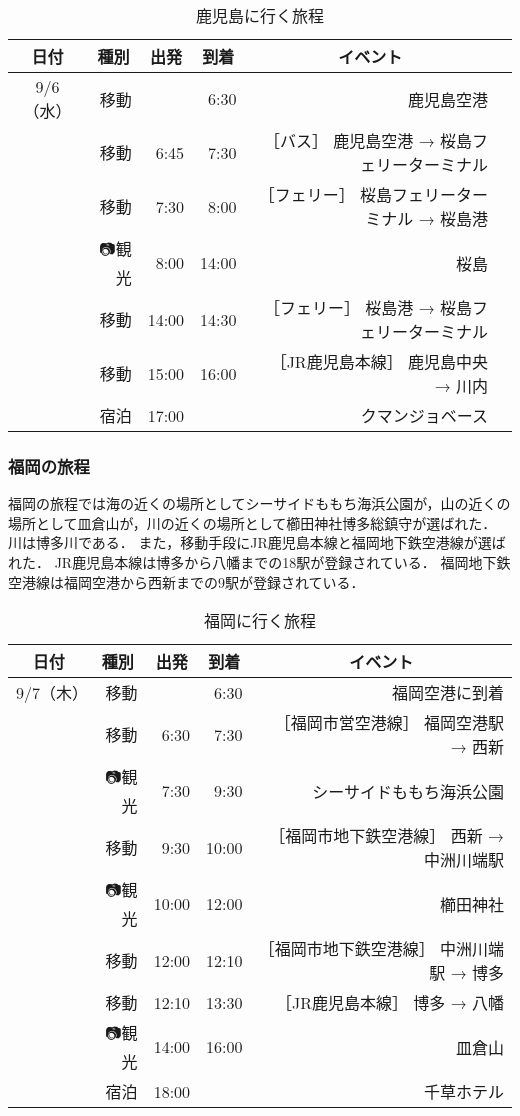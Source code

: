 \begin{table}[h]
  \caption{鹿児島に行く旅程}
  \centering
  \begin{tabular}{|c|r|r|r|r|r|}
  \hline
  \multicolumn{1}{|c|}{日付} & \multicolumn{1}{c|}{種別} & \multicolumn{1}{c|}{出発} & \multicolumn{1}{c|}{到着} & \multicolumn{1}{c|}{イベント}\\
  \hline \hline
  9/6（水） & 👣移動 &  & 6:30 & 鹿児島空港\\ \hline
  & 👣移動 & 6:45 & 7:30 & ［バス］ 鹿児島空港 → 桜島フェリーターミナル\\ \hline
  & 👣移動 & 7:30 & 8:00 & ［フェリー］ 桜島フェリーターミナル → 桜島港\\ \hline
  & 📷観光 & 8:00 & 14:00 & 桜島\\ \hline
  & 👣移動 & 14:00 & 14:30 & ［フェリー］ 桜島港 → 桜島フェリーターミナル \\ \hline
  & 👣移動 & 15:00 & 16:00 & ［JR鹿児島本線］ 鹿児島中央 → 川内\\ \hline
  & 🏨宿泊 & 17:00 &  & クマンジョベース\\ \hline
  \end{tabular}
  \label{table:resultEx1}
\end{table}

\subsubsection{福岡の旅程}
福岡の旅程では海の近くの場所としてシーサイドももち海浜公園が，山の近くの場所として皿倉山が，川の近くの場所として櫛田神社博多総鎮守が選ばれた．
川は博多川である．
また，移動手段にJR鹿児島本線と福岡地下鉄空港線が選ばれた．
JR鹿児島本線は博多から八幡までの18駅が登録されている．
福岡地下鉄空港線は福岡空港から西新までの9駅が登録されている．

\begin{table}[h]
  \caption{福岡に行く旅程}
  \centering
  \begin{tabular}{|c|r|r|r|r|}
  \hline
  \multicolumn{1}{|c|}{日付} &  \multicolumn{1}{c|}{種別} &  \multicolumn{1}{c|}{出発} &  \multicolumn{1}{c|}{到着} &  \multicolumn{1}{c|}{イベント}\\
  \hline \hline
  9/7（木） & 👣移動 &  & 6:30 & 福岡空港に到着\\ \hline
   & 👣移動 & 6:30 & 7:30 & ［福岡市営空港線］ 福岡空港駅 → 西新\\ \hline
   & 📷観光 & 7:30 & 9:30 & シーサイドももち海浜公園\\ \hline
   & 👣移動 & 9:30 & 10:00 & ［福岡市地下鉄空港線］ 西新 → 中洲川端駅\\ \hline
   & 📷観光 & 10:00 & 12:00 & 櫛田神社\\ \hline
   & 👣移動 & 12:00 & 12:10 & ［福岡市地下鉄空港線］ 中洲川端駅 → 博多\\ \hline
   & 👣移動 & 12:10 & 13:30 & ［JR鹿児島本線］ 博多 → 八幡\\ \hline
   & 📷観光 & 14:00 & 16:00 & 皿倉山\\ \hline
   & 🏨宿泊 & 18:00 &  & 千草ホテル\\ \hline
  \end{tabular}
  \label{table:resultEx1}
\end{table}

